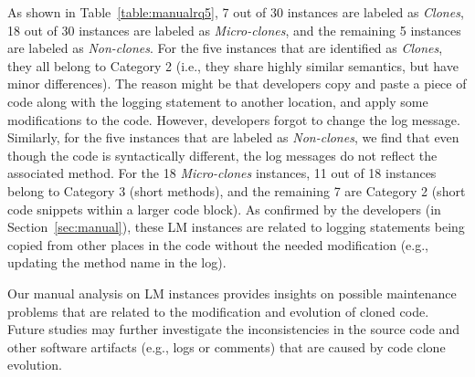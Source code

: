 
 As shown in Table~\ref{table:manualrq5}, 7 out of 30 instances are labeled as {\em Clones}, 18 out of 30 instances are labeled as {\em Micro-clones}, and the remaining 5 instances are labeled as {\em Non-clones}. For the five instances that are identified as {\em Clones}, they all belong to Category 2 (i.e., they share highly similar semantics, but have minor differences). The reason might be that developers copy and paste a piece of code along with the logging statement to another location, and apply some modifications to the code. However, developers forgot to change the log message. Similarly, for the five instances that are labeled as {\em Non-clones}, we find that even though the code is syntactically different, the log messages do not reflect the associated method. For the 18 {\em Micro-clones} instances, 11 out of 18 instances belong to Category 3 (short methods), and the remaining 7 are Category 2 (short code snippets within a larger code block). As confirmed by the developers (in Section~\ref{sec:manual}), these LM instances are related to logging statements being copied from other places in the code without the needed modification (e.g., updating the method name in the log).

Our manual analysis on LM instances provides insights on possible maintenance problems that are related to the modification and evolution of cloned code. Future studies may further investigate the inconsistencies in the source code and other software artifacts (e.g., logs or comments) that are caused by code clone evolution.




